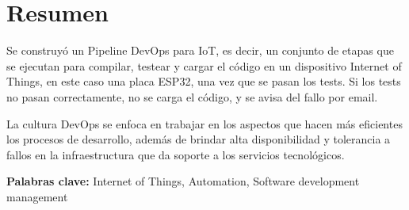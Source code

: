 \chapter*{Resumen}
Se construyó un Pipeline DevOps para IoT, es decir, un conjunto de etapas que se ejecutan para compilar, testear y cargar el código en un dispositivo Internet of Things, en este caso una placa ESP32, una vez que se pasan los tests. Si los tests no pasan correctamente, no se carga el código, y se avisa del fallo por email. 

La cultura DevOps se enfoca en trabajar en los aspectos que hacen más eficientes los procesos de desarrollo, además de brindar alta disponibilidad y tolerancia a fallos en la infraestructura que da soporte a los servicios tecnológicos.

\vspace{.5cm}

\textbf{Palabras clave:} Internet of Things, Automation, Software development management



